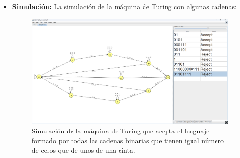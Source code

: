\documentclass[11pt]{report}
\begin{document}
\begin{itemize}
  \item \textbf{Simulación:} La simulación de la máquina de Turing con algunas cadenas:
        \begin{figure}[H]
          \centering
          \includegraphics[scale=0.33]{img/MT_05_one_ribbon_simulation.png}
          \caption{Simulación de la máquina de Turing que acepta el lenguaje formado por todas las cadenas binarias que tienen igual número de ceros que de unos de una cinta.}
          \label{fig:simulacion de la maquina de turing que acepta el lenguaje formado por todas las cadenas binarias que tienen igual número de ceros que de unos de una cinta}
        \end{figure}
\end{itemize}

\newpage
\end{document}
